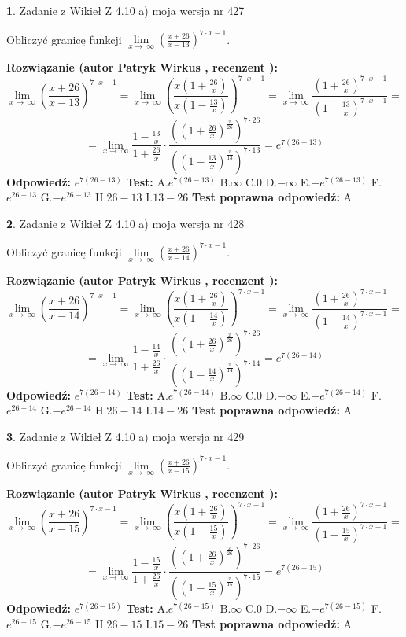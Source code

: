 \documentclass[12pt, a4paper]{article}
\theoremstyle{definition} %
\newtheorem{zad}{}
\newcommand{\zadStart}[1]{\begin{zad}#1\newline}
\newcommand{\zadStop}{\end{zad}}
\newcommand{\rozwStart}[2]{\noindent \textbf{Rozwiązanie (autor #1 , recenzent #2): }\newline}
\newcommand{\rozwStop}{\newline}
\newcommand{\odpStart}{\noindent \textbf{Odpowiedź:}\newline}
\newcommand{\odpStop}{\newline}
\newcommand{\testStart}{\noindent \textbf{Test:}\newline}
\newcommand{\testStop}{\newline}
\newcommand{\kluczStart}{\noindent \textbf{Test poprawna odpowiedź:}\newline}
\newcommand{\kluczStop}{\newline}
\begin{document}
\zadStart{Zadanie z Wikieł Z 4.10 a) moja wersja nr 427}


Obliczyć granicę funkcji  $\lim\limits_{x\to\ \infty}(\frac{x+26}{x-13})^{7\cdot x-1}$.
\zadStop
\rozwStart{Patryk Wirkus}{}
$$\lim\limits_{x\to\ \infty}(\frac{x+26}{x-13})^{7\cdot x-1} = \lim\limits_{x\to\ \infty}(\frac{x(1+\frac{26}{x})}{x(1-\frac{13}{x})})^{7\cdot x-1}=\lim\limits_{x\to\ \infty}\frac{(1+\frac{26}{x})^{7\cdot x-1}}{(1-\frac{13}{x})^{7\cdot x-1}}=$$
$$=\lim\limits_{x\to\ \infty}\frac{1-\frac{13}{x}}{1+\frac{26}{x}}\cdot\frac{((1+\frac{26}{x})^{\frac{x}{26}})^{7\cdot26}}{((1-\frac{13}{x})^{\frac{x}{13}})^{7\cdot13}}=e^{7(26-13)}$$
\rozwStop
\odpStart
$e^{7(26-13)}$
\odpStop
\testStart
A.$e^{7(26-13)}$ B.$\infty$ C.$0$ D.$-\infty$ E.$-e^{7(26-13)}$
F.$e^{26-13}$ G.$-e^{26-13}$
H.$26-13$
I.$13-26$
\testStop
\kluczStart
A
\kluczStop



\zadStart{Zadanie z Wikieł Z 4.10 a) moja wersja nr 428}


Obliczyć granicę funkcji  $\lim\limits_{x\to\ \infty}(\frac{x+26}{x-14})^{7\cdot x-1}$.
\zadStop
\rozwStart{Patryk Wirkus}{}
$$\lim\limits_{x\to\ \infty}(\frac{x+26}{x-14})^{7\cdot x-1} = \lim\limits_{x\to\ \infty}(\frac{x(1+\frac{26}{x})}{x(1-\frac{14}{x})})^{7\cdot x-1}=\lim\limits_{x\to\ \infty}\frac{(1+\frac{26}{x})^{7\cdot x-1}}{(1-\frac{14}{x})^{7\cdot x-1}}=$$
$$=\lim\limits_{x\to\ \infty}\frac{1-\frac{14}{x}}{1+\frac{26}{x}}\cdot\frac{((1+\frac{26}{x})^{\frac{x}{26}})^{7\cdot26}}{((1-\frac{14}{x})^{\frac{x}{14}})^{7\cdot14}}=e^{7(26-14)}$$
\rozwStop
\odpStart
$e^{7(26-14)}$
\odpStop
\testStart
A.$e^{7(26-14)}$ B.$\infty$ C.$0$ D.$-\infty$ E.$-e^{7(26-14)}$
F.$e^{26-14}$ G.$-e^{26-14}$
H.$26-14$
I.$14-26$
\testStop
\kluczStart
A
\kluczStop



\zadStart{Zadanie z Wikieł Z 4.10 a) moja wersja nr 429}


Obliczyć granicę funkcji  $\lim\limits_{x\to\ \infty}(\frac{x+26}{x-15})^{7\cdot x-1}$.
\zadStop
\rozwStart{Patryk Wirkus}{}
$$\lim\limits_{x\to\ \infty}(\frac{x+26}{x-15})^{7\cdot x-1} = \lim\limits_{x\to\ \infty}(\frac{x(1+\frac{26}{x})}{x(1-\frac{15}{x})})^{7\cdot x-1}=\lim\limits_{x\to\ \infty}\frac{(1+\frac{26}{x})^{7\cdot x-1}}{(1-\frac{15}{x})^{7\cdot x-1}}=$$
$$=\lim\limits_{x\to\ \infty}\frac{1-\frac{15}{x}}{1+\frac{26}{x}}\cdot\frac{((1+\frac{26}{x})^{\frac{x}{26}})^{7\cdot26}}{((1-\frac{15}{x})^{\frac{x}{15}})^{7\cdot15}}=e^{7(26-15)}$$
\rozwStop
\odpStart
$e^{7(26-15)}$
\odpStop
\testStart
A.$e^{7(26-15)}$ B.$\infty$ C.$0$ D.$-\infty$ E.$-e^{7(26-15)}$
F.$e^{26-15}$ G.$-e^{26-15}$
H.$26-15$
I.$15-26$
\testStop
\kluczStart
A
\kluczStop
\end{document}
